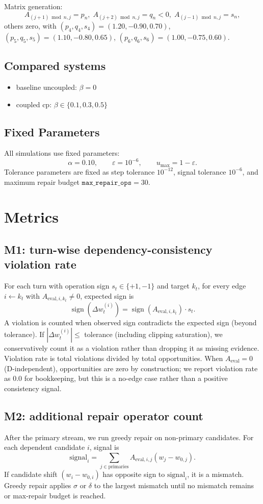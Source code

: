 \documentclass[11pt,a4paper]{article}
\begin{document}
Matrix generation:
\[
A_{(j+1)\bmod n,j}=p_n,\;
A_{(j+2)\bmod n,j}=q_n<0,\;
A_{(j-1)\bmod n,j}=s_n,
\]
others zero, with
\((p_4,q_4,s_4)=(1.20,-0.90,0.70)\),
\((p_5,q_5,s_5)=(1.10,-0.80,0.65)\),
\((p_6,q_6,s_6)=(1.00,-0.75,0.60)\).

\subsection{Compared systems}
\begin{itemize}
  \item baseline uncoupled: \(\beta=0\)
  \item coupled cp: \(\beta\in\{0.1,0.3,0.5\}\)
\end{itemize}

\subsection{Fixed Parameters}
All simulations use fixed parameters:
\[
\alpha=0.10,\qquad \varepsilon=10^{-6},\qquad u_{\max}=1-\varepsilon.
\]
Tolerance parameters are fixed as step tolerance \(10^{-12}\), signal tolerance \(10^{-6}\), and maximum repair budget \(\texttt{max\_repair\_ops}=30\).

\section{Metrics}
\label{sec:metrics}
\subsection{M1: turn-wise dependency-consistency violation rate}
For each turn with operation sign \(s_t\in\{+1,-1\}\) and target \(k_t\), for every edge \(i\leftarrow k_t\) with \(A_{\text{eval},i,k_t}\neq 0\), expected sign is
\[
\operatorname{sign}(\Delta w_t^{(i)}) = \operatorname{sign}(A_{\text{eval},i,k_t})\cdot s_t.
\]
A violation is counted when observed sign contradicts the expected sign (beyond tolerance). If \(|\Delta w_t^{(i)}|\le\) tolerance (including clipping saturation), we conservatively count it as a violation rather than dropping it as missing evidence.
Violation rate is total violations divided by total opportunities.
When \(A_{\text{eval}}=0\) (D-independent), opportunities are zero by construction; we report violation rate as 0.0 for bookkeeping, but this is a no-edge case rather than a positive consistency signal.

\subsection{M2: additional repair operator count}
After the primary stream, we run greedy repair on non-primary candidates.
For each dependent candidate \(i\), signal is
\[
\text{signal}_i = \sum_{j\in\text{primaries}} A_{\text{eval},i,j}(w_j-w_{0,j}).
\]
If candidate shift \((w_i-w_{0,i})\) has opposite sign to \(\text{signal}_i\), it is a mismatch.
Greedy repair applies \(\sigma\) or \(\delta\) to the largest mismatch until no mismatch remains or max-repair budget is reached.
\end{document}
